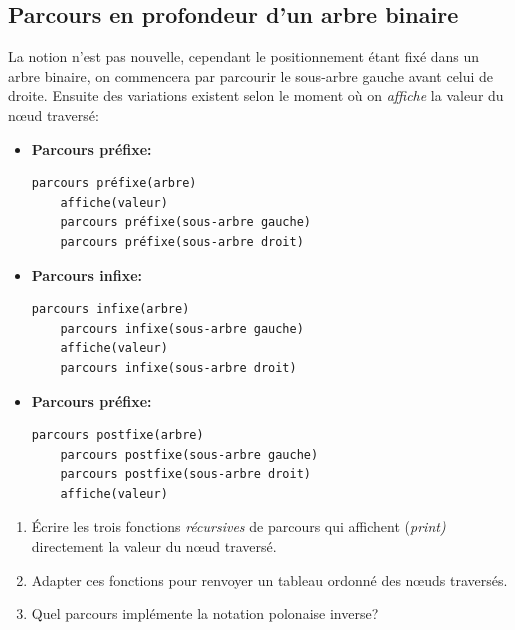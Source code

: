 \documentclass[a4paper,11pt]{article}
\begin{document}
\begin{Form}
\subsection{Parcours en profondeur d'un arbre binaire}
La notion n'est pas nouvelle, cependant le positionnement étant fixé dans un arbre binaire, on commencera par parcourir le sous-arbre gauche avant celui de droite. Ensuite des variations existent selon le moment où on \emph{affiche} la valeur du nœud traversé:
\begin{itemize}
\item \textbf{Parcours préfixe:}
\begin{lstlisting}
parcours préfixe(arbre)
	affiche(valeur)
	parcours préfixe(sous-arbre gauche)
	parcours préfixe(sous-arbre droit)
\end{lstlisting}
\item \textbf{Parcours infixe:}
\begin{lstlisting}
parcours infixe(arbre)
	parcours infixe(sous-arbre gauche)
	affiche(valeur)
	parcours infixe(sous-arbre droit)
\end{lstlisting}
\item \textbf{Parcours préfixe:}
\begin{lstlisting}
parcours postfixe(arbre)
	parcours postfixe(sous-arbre gauche)
	parcours postfixe(sous-arbre droit)
	affiche(valeur)
\end{lstlisting}
\end{itemize}
\begin{activite}
\begin{enumerate}
\item Écrire les trois fonctions \emph{récursives} de parcours qui affichent (\emph{print)} directement la valeur du nœud traversé.
\item Adapter ces fonctions pour renvoyer un tableau ordonné des nœuds traversés.
\item Quel parcours implémente la notation polonaise inverse?
\end{enumerate}
\end{activite}
\end{Form}
\end{document}
